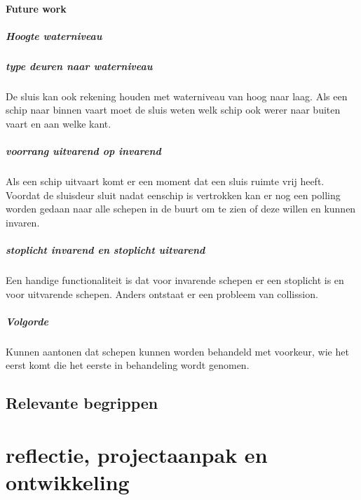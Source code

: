 			\subsection{Future work}
			\subsubsection{Hoogte waterniveau}
			
			\subsubsection{type deuren naar waterniveau}
			De sluis kan ook rekening houden met waterniveau van hoog naar laag.
			Als een schip naar binnen vaart moet de sluis weten welk schip ook werer naar buiten vaart en aan welke kant.
			
			\subsubsection{voorrang uitvarend op invarend}
			Als een schip uitvaart komt er een moment dat een sluis ruimte vrij heeft. Voordat de sluisdeur sluit nadat eenschip is vertrokken kan er nog een polling worden gedaan naar alle schepen in de buurt om te zien of deze willen en kunnen invaren.
			
			\subsubsection{stoplicht invarend en stoplicht uitvarend}
			Een handige functionaliteit is dat voor invarende schepen er een stoplicht is en voor uitvarende schepen. Anders ontstaat er een probleem van collission. 
			
			\subsubsection{Volgorde}
			Kunnen aantonen dat schepen kunnen worden behandeld met voorkeur, wie het eerst komt die het eerste in behandeling wordt genomen.
			
			\chapter{Relevante begrippen}
			
			
			
			
			\part{reflectie, projectaanpak en ontwikkeling}
			

